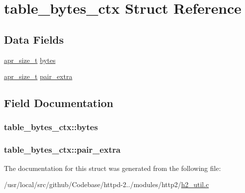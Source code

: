 \hypertarget{structtable__bytes__ctx}{}\section{table\+\_\+bytes\+\_\+ctx Struct Reference}
\label{structtable__bytes__ctx}
\subsection*{Data Fields}
\begin{DoxyCompactItemize}
\item 
\hyperlink{group__apr__platform_gaaa72b2253f6f3032cefea5712a27540e}{apr\+\_\+size\+\_\+t} \hyperlink{structtable__bytes__ctx_a07ca17a602ff54b54350190e0bdb436d}{bytes}
\item 
\hyperlink{group__apr__platform_gaaa72b2253f6f3032cefea5712a27540e}{apr\+\_\+size\+\_\+t} \hyperlink{structtable__bytes__ctx_aff0bfe205b290c5d868434fd791c9041}{pair\+\_\+extra}
\end{DoxyCompactItemize}


\subsection{Field Documentation}
\subsubsection[{\texorpdfstring{bytes}{bytes}}]{ table\+\_\+bytes\+\_\+ctx\+::bytes}\hypertarget{structtable__bytes__ctx_a07ca17a602ff54b54350190e0bdb436d}{}\label{structtable__bytes__ctx_a07ca17a602ff54b54350190e0bdb436d}
\subsubsection[{\texorpdfstring{pair\+\_\+extra}{pair_extra}}]{ table\+\_\+bytes\+\_\+ctx\+::pair\+\_\+extra}\hypertarget{structtable__bytes__ctx_aff0bfe205b290c5d868434fd791c9041}{}\label{structtable__bytes__ctx_aff0bfe205b290c5d868434fd791c9041}


The documentation for this struct was generated from the following file\+:\begin{DoxyCompactItemize}
\item 
/usr/local/src/github/\+Codebase/httpd-\/2../modules/http2/\hyperlink{h2__util_8c}{h2\+\_\+util.\+c}\end{DoxyCompactItemize}
